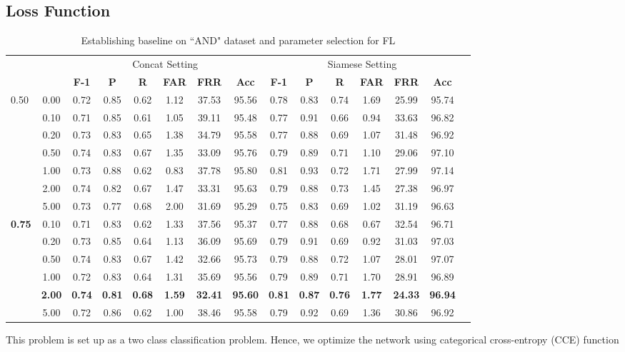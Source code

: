 \documentclass[a4paper,conference]{IEEEtran}
\begin{document}
\subsection{Loss Function}
\begin{table*}[!htp]\centering
\caption{Establishing baseline on ``AND" dataset and parameter selection for FL}\label{tab:baseline_and}
\scriptsize
\begin{tabular}{lc|cccccc|ccccccc}\toprule
& &\multicolumn{6}{c|}{Concat Setting} &\multicolumn{6}{c}{Siamese Setting} \\\cmidrule{3-14}
\textbf{} &\textbf{} &\textbf{F-1} &\textbf{P} &\textbf{R} &\textbf{FAR} &\textbf{FRR} &\textbf{Acc} &\textbf{F-1} &\textbf{P} &\textbf{R} &\textbf{FAR} &\textbf{FRR} &\textbf{Acc } \\\midrule
\multirow{7}{*}{0.50} &0.00 &0.72 &0.85 &0.62 &1.12 &37.53 &95.56 &0.78 &0.83 &0.74 &1.69 &25.99 &95.74 \\
&0.10 &0.71 &0.85 &0.61 &1.05 &39.11 &95.48 &0.77 &0.91 &0.66 &0.94 &33.63 &96.82 \\
&0.20 &0.73 &0.83 &0.65 &1.38 &34.79 &95.58 &0.77 &0.88 &0.69 &1.07 &31.48 &96.92 \\
&0.50 &0.74 &0.83 &0.67 &1.35 &33.09 &95.76 &0.79 &0.89 &0.71 &1.10 &29.06 &97.10 \\
&1.00 &0.73 &0.88 &0.62 &0.83 &37.78 &95.80 &0.81 &0.93 &0.72 &1.71 &27.99 &97.14 \\
&2.00 &0.74 &0.82 &0.67 &1.47 &33.31 &95.63 &0.79 &0.88 &0.73 &1.45 &27.38 &96.97 \\
&5.00 &0.73 &0.77 &0.68 &2.00 &31.69 &95.29 &0.75 &0.83 &0.69 &1.02 &31.19 &96.63 \\
\midrule
\multirow{6}{*}{\textbf{0.75}} &0.10 &0.71 &0.83 &0.62 &1.33 &37.56 &95.37 &0.77 &0.88 &0.68 &0.67 &32.54 &96.71 \\
&0.20 &0.73 &0.85 &0.64 &1.13 &36.09 &95.69 &0.79 &0.91 &0.69 &0.92 &31.03 &97.03 \\
&0.50 &0.74 &0.83 &0.67 &1.42 &32.66 &95.73 &0.79 &0.88 &0.72 &1.07 &28.01 &97.07 \\
&1.00 &0.72 &0.83 &0.64 &1.31 &35.69 &95.56 &0.79 &0.89 &0.71 &1.70 &28.91 &96.89 \\
&\textbf{2.00} &\textbf{0.74} &\textbf{0.81} &\textbf{0.68} &\textbf{1.59} &\textbf{32.41} &\textbf{95.60} &\textbf{0.81} &\textbf{0.87} &\textbf{0.76} &\textbf{1.77} &\textbf{24.33} &\textbf{96.94} \\
&5.00 &0.72 &0.86 &0.62 &1.00 &38.46 &95.58 &0.79 &0.92 &0.69 &1.36 &30.86 &96.92 \\
\bottomrule
\end{tabular}
\end{table*}
This problem is set up as a two class classification problem. Hence, we optimize the network using categorical cross-entropy (CCE) function 
\end{document}
